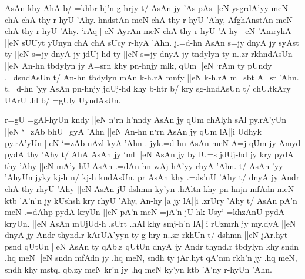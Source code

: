 \documentclass[a4paper,11pt]{article}
\begin{document}
AsAn khy AhA b/ =khbr hj'n g-hrjy t/ AsAn jy 'As pAs ||eN ysgrdA'yy
meN chA chA thy r-hyU 'Ahy. hndstAn meN chA thy r-hyU 'Ahy, AfghAnstAn
meN chA thy r-hyU 'Ahy. `rAq ||eN AyrAn meN chA thy r-hyU 'A-hy ||eN
'AmrykA ||eN sUUyt yUnyn chA chA sUcy r-hyA 'Ahn. j.=d-hn AsAn s=jy
dnyA jy syAst ty ||eN s=jy dnyA jy jdUj-hd ty ||eN s=jy dnyA jy
tndylyn ty n..zr rkhndAsUn ||eN An-hn tbdylyn jy A=srn khy pn-hnjy
mlk, qUm ||eN `rAm ty pUndy .=dsndAsUn t/ An-hn tbdylyn mAn k-h.rA
mnfy ||eN k-h.rA m=sbt A=sr 'Ahn. t.=d-hn 'yy AsAn pn-hnjy jdUj-hd khy
b-htr b/ kry sg-hndAsUn t/ chU.tkAry UArU .hl b/ =gUly UyndAsUn.


r=gU =gAl-hyUn kndy ||eN n`rn h'nndy AsAn jy qUm chAlyh sAl py.rA'yUn
||eN `=zAb bhU=gyA 'Ahn ||eN An-hn n`rn AsAn jy qUm lA||i Udhyk
py.rA'yUn ||eN `=zAb nAzl kyA 'Ahn . jyk.=d-hn AsAn meN A=j qUm jy
Amyd pydA thy 'Ahy t/ AhA AsAn jy `ml ||eN AsAn jy by lU=s jdUj-hd jy
kry pydA thy 'Ahy ||eN mA'y-hU AsAn .=dAn-hn wAj-hA'yy rhyA 'Ahn. t/
AsAn 'yy 'AhyUn jyky kj-h n/ kj-h kndAsUn. pr AsAn khy .=ds'nU 'Ahy t/
dnyA jy Andr chA thy rhyU {}'Ahy ||eN AsAn jU dshmn ky'yn .hAltn khy
pn-hnjn mfAdn meN ktb 'A'n'n jy kUshsh kry rhyU 'Ahy, An-hy||a jy
lA||i .zrUry 'Ahy t/ AsAn pA'n meN .=dAhp pydA kryUn ||eN pA'n meN
=jA'n jU hk Usy` =khzAnU pydA kryUn. ||eN AsAn mUjUd-h .sUrt .hAl khy
smj-h'n lA||i rUzmrh jy my.dyA ||eN dnyA jy Andr thynd.r kArUA'yyn ty
g-hry n..zr rkhUn t/ dshmn ||eN jAr.hyt psnd qUtUn ||eN AsAn ty qAb.z
qUtUn dnyA jy Andr thynd.r tbdylyn khy sndn .hq meN ||eN sndn mfAdn jy
.hq meN, sndh ty jAr.hyt qA'nm rkh'n jy .hq meN, sndh khy mstql qb.zy
meN kr'n jy .hq meN ky'yn ktb 'A'ny r-hyUn 'Ahn.

\popocplist
\end{document}
